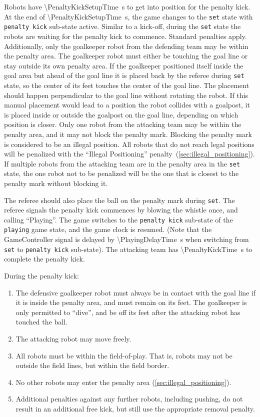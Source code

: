Robots have \qty{\PenaltyKickSetupTime}{\second} to get into position for the penalty kick.
At the end of \qty{\PenaltyKickSetupTime}{\second}, the game changes to the \texttt{set} state with \texttt{penalty kick} sub-state active.
Similar to a kick-off, during the \texttt{set} state the robots are waiting for the penalty kick to commence.
Standard penalties apply.
Additionally, only the goalkeeper robot from the defending team may be within the penalty area.
The goalkeeper robot must either be touching the goal line or stay outside its own penalty area.
If the goalkeeper positioned itself inside the goal area but ahead of the goal line it is placed back by the referee during \texttt{set} state, so the center of its feet touches the center of the goal line.
The placement should happen perpendicular to the goal line without rotating the robot.
If this manual placement would lead to a position the robot collides with a goalpost, it is placed inside or outside the goalpost on the goal line, depending on which position is closer.
Only one robot from the attacking team may be within the penalty area, and it may not block the penalty mark.
Blocking the penalty mark is considered to be an illegal position.
All robots that do not reach legal positions will be penalized with the ``Illegal Positioning'' penalty~(\cf \cref{sec:illegal_positioning}).
If multiple robots from the attacking team are in the penalty area in the \texttt{set} state, the one robot not to be penalized will be the one that is closest to the penalty mark without blocking it.

The referee should also place the ball on the penalty mark during \texttt{set}.
The referee signals the penalty kick commences by blowing the whistle once, and calling ``Playing''.
The game switches to the \texttt{penalty kick} sub-state of the \texttt{playing} game state, and the game clock is resumed.
(Note that the GameController signal is delayed by \qty{\PlayingDelayTime}{\second} when switching from \texttt{set} to \texttt{penalty kick} sub-state).
The attacking team has \qty{\PenaltyKickTime}{\second} to complete the penalty kick.

During the penalty kick:
\begin{enumerate}
  \item The defensive goalkeeper robot must always be in contact with the goal line if it is inside the penalty area, and must remain on its feet.
    The goalkeeper is only permitted to ``dive'', and be off its feet after the attacking robot has touched the ball.
  \item The attacking robot may move freely.
  \item All robots must be within the field-of-play.
    That is, robots may not be outside the field lines, but within the field border.
  \item No other robots may enter the penalty area (\cf \cref{sec:illegal_positioning}).
  \item Additional penalties against any further robots, including pushing, do not result in an additional free
    kick, but still use the appropriate removal penalty.
\end{enumerate}

